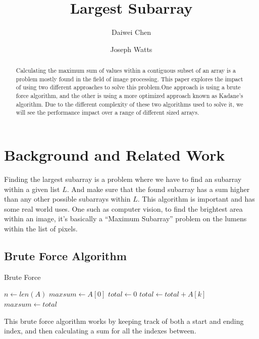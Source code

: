 \documentclass[10pt, letterpaper]{article}
\title{Largest Subarray}
\author{Daiwei Chen \and Joseph Watts}
\begin{document}
	\maketitle
	\begin{abstract}
		Calculating the maximum sum of values within a contiguous subset of an array is a problem mostly found in the field of image processing. 
		This paper explores the impact of using two different approaches to solve this problem.One approach is using a brute force algorithm, and the other is using a more optimized approach known as Kadane's algorithm.
		Due to the different complexity of these two algorithms used to solve it,
		we will see the performance impact over a range of different sized arrays.
	\end{abstract}
	\section{Background and Related Work}
  Finding the largest subarray is a problem where we have to find an subarray within a given list $L$. And make sure that the found subarray has a sum higher than any other possible subarrays within $L$.
  This algorithm is important and has some real world uses. One such as computer vision, to find the brightest area within an image, it's basically a ``Maximum Subarray'' problem on the lumens within the list of pixels.

	\subsection{Brute Force Algorithm}

	\begin{algorithm}
	\begin{algorithmic}
		\caption{Brute Force}\label{bruteforce}
	\State $n\gets len(A)$
	\State $maxsum\gets A[0]$
	\State $total\gets 0$
	\State $total\gets total + A[k]$
	\EndFor
	\State $maxsum\gets total$
	\EndIf
	\EndFor
	\EndFor
	\EndFunction
	\end{algorithmic}
	\end{algorithm}


	This brute force algorithm works by keeping track of both a start and ending index, and then calculating a sum for all the indexes between.
\end{document}
